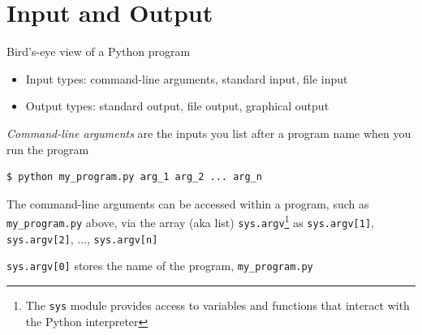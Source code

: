 \documentclass[8pt,a4paper,compress]{beamer}
\begin{document}
\section{Input and Output}
\begin{frame}[fragile]
Bird's-eye view of a Python program
\begin{center}
\end{center}
\begin{itemize}
\item Input types: command-line arguments, standard input, file input
\item Output types: standard output, file output, graphical output
\end{itemize}
\end{frame}

\begin{frame}[fragile]
\emph{Command-line arguments} are the inputs you list after a program name when you run the program

\begin{lstlisting}[language={}]
$ python my_program.py arg_1 arg_2 ... arg_n
\end{lstlisting}

\bigskip

The command-line arguments can be accessed within a program, such as \lstinline{my_program.py} above, via the array (aka list) \lstinline{sys.argv}\footnote{The \lstinline{sys} module provides access to variables and functions that interact with the Python interpreter}  as \lstinline{sys.argv[1]}, \lstinline{sys.argv[2]}, $\dots$, \lstinline{sys.argv[n]}

\bigskip

\lstinline{sys.argv[0]} stores the name of the program, \lstinline{my_program.py}
\end{frame}
\end{document}
